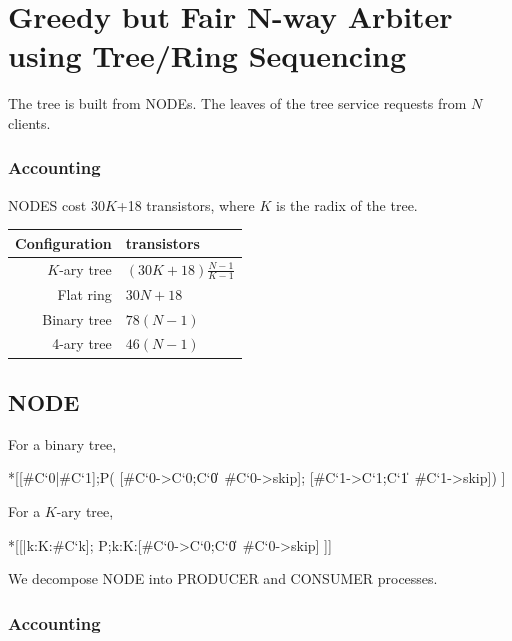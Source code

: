 \documentclass{article}
\begin{document}
\section{Greedy but Fair N-way Arbiter using Tree/Ring Sequencing}

The tree is built from NODEs. 
The leaves of the tree service requests from $N$ clients.

\subsubsection*{Accounting}

NODES cost 30$K$+18 transistors, where $K$ is the radix of the tree.

\begin{center}
    \begin{tabular}{|r|l|}
    \hline
    Configuration & transistors \\ \hline
    $K$-ary tree & $(30K+18)\frac{N-1}{K-1}$ \\ \hline
    Flat ring & $30N+18$ \\ \hline
    Binary tree & $78(N-1)$ \\ \hline
    4-ary tree & $46(N-1)$ \\ \hline
    \end{tabular}
\end{center}

\subsection{NODE}

For a binary tree,

\begin{csp}
*[[#{C`0}|#{C`1}];P\*(
  [#{C`0}->C`0;C`0\|~#{C`0}->skip];
  [#{C`1}->C`1;C`1\|~#{C`1}->skip])
 ]
\end{csp}

\noindent
For a $K$-ary tree,

\begin{csp}
*[[\langle|k:K:#{C`k}\rangle];
  P\*\langle;k:K:[#{C`0}->C`0;C`0\|~#{C`0}->skip]\rangle
 ]]
\end{csp}

\noindent
We decompose NODE into PRODUCER and CONSUMER processes.

\subsubsection*{Accounting}
\end{document}
